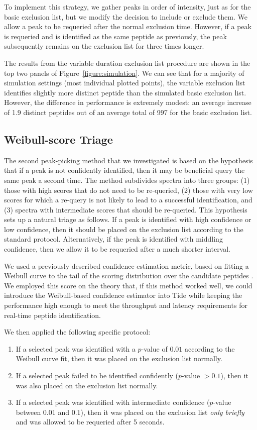 \documentclass[12pt]{article}
\begin{document}
To implement this strategy, we gather peaks in order of intensity, just
as for the basic exclusion list, but we modify the decision to include or
exclude them. We allow a peak to be requeried after the normal
exclusion time. However, if a peak is requeried and is identified as the same
peptide as previously, the peak subsequently remains on the exclusion list for
three times longer.

The results from the variable duration exclusion list procedure are shown in the top two panels of Figure~\ref{figure:simulation}. We can see that for a
majority of simulation settings (most individual plotted points), the variable
exclusion list identifies slightly more distinct peptide than the simulated basic
exclusion list. However, the difference in performance is extremely modest: an
average increase of 1.9 distinct peptides out of an average total of 997 for
the basic exclusion list.

\subsection*{Weibull-score Triage}

The second peak-picking method that we investigated is based on the
hypothesis that if a peak is not confidently identified, then it may
be beneficial query the same peak a second time.  The method
subdivides spectra into three groups: (1) those with high scores that
do not need to be re-queried, (2) those with very low scores for which
a re-query is not likely to lead to a successful identification, and
(3) spectra with intermediate scores that should be re-queried.  This
hypothesis sets up a natural triage as follows. If a peak is
identified with high confidence or low confidence, then it should be
placed on the exclusion list according to the standard
protocol. Alternatively, if the peak is identified with middling
confidence, then we allow it to be requeried after a much shorter
interval.

We used a previously described confidence estimation metric, 
based on fitting a Weibull curve to the tail of the scoring distribution over
the candidate peptides \cite{klammer:statistical}. We employed this score on the theory that, if this method worked
well, we could introduce the Weibull-based confidence estimator into Tide while
keeping the performance high enough to meet the throughput and latency
requirements for real-time peptide identification.

We then applied the following specific protocol:
\begin{enumerate}
\item If a selected peak was identified with a $p$-value of $0.01$
according to the Weibull curve fit, then it was placed on the exclusion list
normally.
\item If a selected peak failed to be identified confidently ($p$-value $>0.1$),
  then it was also placed on the exclusion list normally.
\item If a selected peak was identified with intermediate confidence ($p$-value
  between $0.01$ and $0.1$), then it was placed on the exclusion list {\em only
    briefly} and was allowed to be requeried after 5 seconds.
\end{enumerate}
\end{document}
